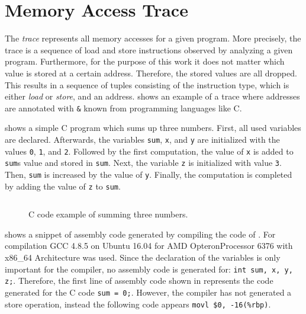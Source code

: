 \documentclass[onecolumn, openright, master, english, signatures]{dbrgrptt}
\begin{document}
\section{Memory Access Trace}\label{sec:memory-access-trace}

The \emph{\ac{trace}} represents all memory accesses for a given program.
More precisely, the \ac{trace} is a sequence of load and store instructions observed by analyzing a given program.
Furthermore, for the purpose of this work it does not matter which value is stored at a certain address.
Therefore, the stored values are all dropped.
This results in a sequence of tuples consisting of the instruction type, which is either \emph{load} or \emph{store}, and an address.
 shows an example of a \ac{trace} where addresses are annotated with \texttt{\&} known from programming languages like C.

 shows a simple C program which sums up three numbers.
First, all used variables are declared.
Afterwards, the variables \texttt{sum}, \texttt{x}, and \texttt{y} are initialized with the values \texttt{0}, \texttt{1}, and \texttt{2}.
Followed by the first computation, the value of \texttt{x} is added to \texttt{sum}s value and stored in \texttt{sum}.
Next, the variable \texttt{z} is initialized with value \texttt{3}.
Then, \texttt{sum} is increased by the value of \texttt{y}.
Finally, the computation is completed by adding the value of \texttt{z} to \texttt{sum}.

\begin{figure}[!ht]
  \centering
  \begin{tabular}{c}
  
  \end{tabular}
  \caption{C code example of summing three numbers.}
  \label{fig:mat-example-c-code}
\end{figure}

 shows a snippet of assembly code generated by compiling the code of .
For compilation GCC 4.8.5 on Ubuntu 16.04 for AMD Opteron\texttrademark Processor 6376 with x86\_64 Architecture was used.
Since the declaration of the variables is only important for the compiler, no assembly code is generated for: \texttt{int sum, x, y, z;}.
Therefore, the first line of assembly code shown in  represents the code generated for the C code \texttt{sum = 0;}.
However, the compiler has not generated a store operation, instead the following code appears \texttt{movl \$0, -16(\%rbp)}.
\end{document}
